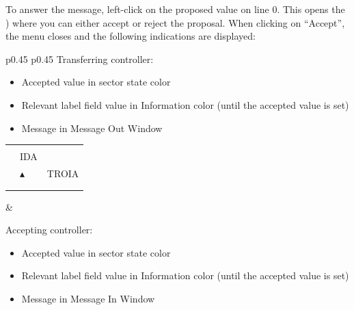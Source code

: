 \documentclass[a4paper,oneside,11pt]{memoir}
\newcommand{\colorref}[1]{\colorbox{Flight Highlight}{\color{#1}#1}}
\newcommand{\winref}[1]{\textit{\titleref{#1}}}
\begin{document}
To answer the message, left-click on the proposed value on line 0. This opens the \winref{menu:ttm}) where you can either accept or reject the proposal. When clicking on “Accept”, the menu closes and the following indications are displayed:

\begin{longtable}{p{} p{}}
  Transferring controller:

  \begin{itemize}
    \item Accepted value in sector state color
    \item Relevant label field value in \colorref{Information} color (until the accepted value is set)
    \item Message in Message Out Window
  \end{itemize}
  
  \begin{tabular}{
    >{\columncolor{Flight Highlight}}l 
    >{\columncolor{Flight Highlight}}l
    >{\columncolor{Flight Highlight}}l }
    {\color{Assumed} H360} & {\color{Assumed} }       & {\color{Assumed} }      \\
    {\color{Assumed} ABC123} & {\color{Coordination} IDA}       & {\color{Assumed} }      \\
    {\color{Assumed} 100}    & {\color{Assumed} $\blacktriangle$} & {\color{Assumed} TROIA} \\
    {\color{Assumed} 180}    & {\color{Assumed} }          & {\color{Assumed} }\\     
    {\color{Information} AHDG}    & {\color{Assumed} }          & {\color{Assumed} }     
  \end{tabular}

  &

  Accepting controller:

  \begin{itemize}
    \item Accepted value in sector state color
    \item Relevant label field value in \colorref{Information} color (until the accepted value is set)
    \item Message in Message In Window
  \end{itemize}
  

\end{longtable}
\end{document}
